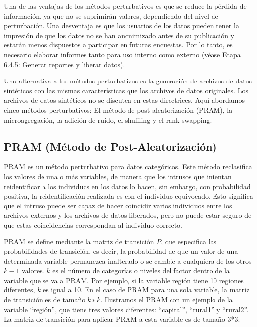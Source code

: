 \documentclass[]{book}
\theoremstyle{definition}
\theoremstyle{definition}
\theoremstyle{definition}
\theoremstyle{definition}
\theoremstyle{remark}
\begin{document}
Una de las ventajas de los métodos perturbativos es que se reduce la pérdida de información, ya que no se suprimirán valores, dependiendo del nivel de perturbación. Una desventaja es que los usuarios de los datos pueden tener la impresión de que los datos no se han anonimizado antes de su publicación y estarán menos dispuestos a participar en futuras encuestas. Por lo tanto, es necesario elaborar informes tanto para uso interno como externo (véase \protect\hyperlink{etapa-6.4.5-generar-reportes-y-liberar-datos}{Etapa 6.4.5: Generar reportes y liberar datos}).

Una alternativa a los métodos perturbativos es la generación de archivos de datos sintéticos con las mismas características que los archivos de datos originales. Los archivos de datos sintéticos no se discuten en estas directrices. Aquí abordamos cinco métodos perturbativos: El método de post aleatorización (PRAM), la microagregación, la adición de ruido, el shuffling y el rank swapping.

\hypertarget{pram-muxe9todo-de-post-aleatorizaciuxf3n}{%
\subsection{PRAM (Método de Post-Aleatorización)}\label{pram-muxe9todo-de-post-aleatorizaciuxf3n}}

PRAM es un método perturbativo para datos categóricos. Este método reclasifica los valores de una o más variables, de manera que los intrusos que intentan reidentificar a los individuos en los datos lo hacen, sin embargo, con probabilidad positiva, la reidentificación realizada es con el individuo equivocado. Esto significa que el intruso puede ser capaz de hacer coincidir varios individuos entre los archivos externos y los archivos de datos liberados, pero no puede estar seguro de que estas coincidencias correspondan al individuo correcto.

PRAM se define mediante la matriz de transición \(P\), que especifica las probabilidades de transición, es decir, la probabilidad de que un valor de una determinada variable permanezca inalterado o se cambie a cualquiera de los otros \(k-1\) valores. \(k\) es el número de categorías o niveles del factor dentro de la variable que se va a PRAM. Por ejemplo, si la variable región tiene 10 regiones diferentes, \(k\) es igual a 10. En el caso de PRAM para una sola variable, la matriz de transición es de tamaño \(k∗k\). Ilustramos el PRAM con un ejemplo de la variable ``región'', que tiene tres valores diferentes: ``capital'', ``rural1'' y ``rural2''. La matriz de transición para aplicar PRAM a esta variable es de tamaño 3*3:
\end{document}

